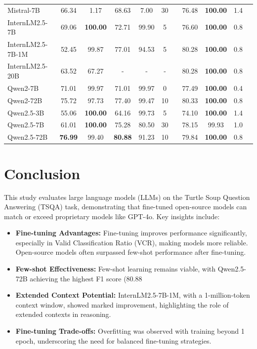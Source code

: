 \documentclass[conference]{IEEEtran}
\begin{document}
\begin{table}[htbp]
{\begin{tabular}{lcccccccccc}
Mistral-7B & 66.34 & 1.17 & 68.63 & 7.00 & 30 & & 76.48 & \textbf{100.00} & 1.4 & \\
InternLM2.5-7B & 69.06 & \textbf{100.00} & 72.71 & 99.90 & 5 & & 76.60 & \textbf{100.00} & 0.8 & \\
InternLM2.5-7B-1M & 52.45 & 99.87 & 77.01 & 94.53 & 5 & & 80.28 & \textbf{100.00} & 0.8 & \\
InternLM2.5-20B & 63.52 & 67.27 & - & - & - & & 80.28 & \textbf{100.00} & 0.8 & \\
Qwen2-7B & 71.01 & 99.97 & 71.01 & 99.97 & 0 & & 77.49 & \textbf{100.00} & 0.4 & \\
Qwen2-72B & 75.72 & 97.73 & 77.40 & 99.47 & 10 & & 80.33 & \textbf{100.00} & 0.8 & \\
Qwen2.5-3B & 55.06 & \textbf{100.00} & 64.16 & 99.73 & 5 & & 74.10 & \textbf{100.00} & 1.4 & \\
Qwen2.5-7B & 61.01 & \textbf{100.00} & 75.28 & 80.50 & 30 & & 78.15 & 99.93 & 1.0 & \\
Qwen2.5-72B & \textbf{76.99} & 99.40 & \textbf{80.88} & 91.23 & 10 & & 79.84 & \textbf{100.00} & 0.8 & \\
\hline
\end{tabular}
}
\end{table}
\fi

\section{Conclusion}

This study evaluates large language models (LLMs) on the Turtle Soup Question Answering (TSQA) task, demonstrating that fine-tuned open-source models can match or exceed proprietary models like GPT-4o. Key insights include:

\begin{itemize}
\item \textbf{Fine-tuning Advantages:} Fine-tuning improves performance significantly, especially in Valid Classification Ratio (VCR), making models more reliable. Open-source models often surpassed few-shot performance after fine-tuning.
\item \textbf{Few-shot Effectiveness:} Few-shot learning remains viable, with Qwen2.5-72B achieving the highest F1 score (80.88%
\item \textbf{Extended Context Potential:} InternLM2.5-7B-1M, with a 1-million-token context window, showed marked improvement, highlighting the role of extended contexts in reasoning.
\item \textbf{Fine-tuning Trade-offs:} Overfitting was observed with training beyond 1 epoch, underscoring the need for balanced fine-tuning strategies.
\end{itemize}
\end{document}
